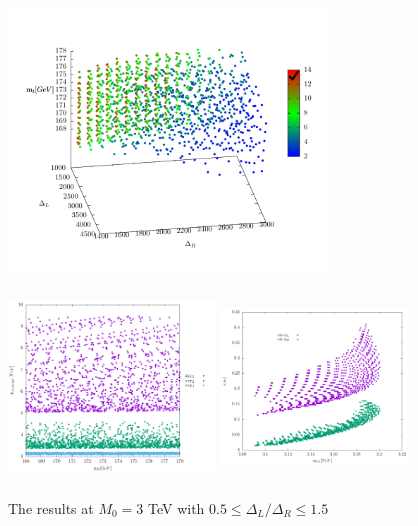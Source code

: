 \documentclass[a4paper]{jpconf}
\begin{document}
 \begin{figure}[h]
	\begin{minipage}[c][10cm]{.5\textwidth}
		\includegraphics[width=8.5cm,height=7cm]{m3000w5ds100LneRy100dm3000_4d}
	\end{minipage}
	\begin{minipage}[c][10cm][t]{.5\textwidth}
		\vspace*{\fill}
		\centering
		\includegraphics[width=5.5cm,height=5cm]{m3000w5ds100LneRy100dm3000_eigen}
		\includegraphics[width=5cm,height=5cm]{m3000w5ds100LneRy100dm3000_mixing}
		\end{minipage}
	\caption{The results at \(M_0 = 3\) TeV with \(0.5 \leq \Delta_L/\Delta_R \leq 1.5\)}
	\label{fig:res2}
\end{figure}
\end{document}
